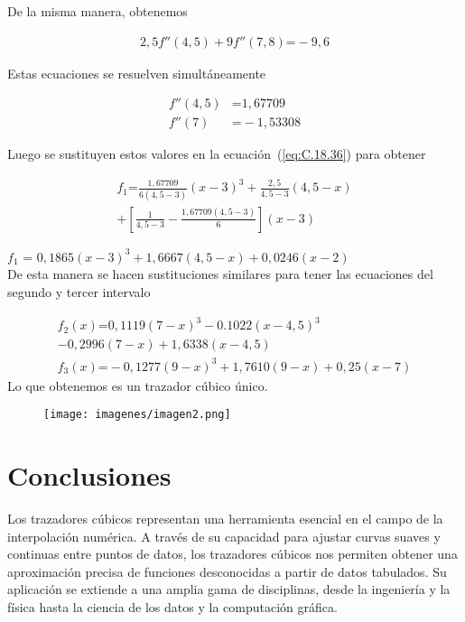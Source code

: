 \documentclass[conference]{IEEEtran}
\begin{document}
De la misma manera, obtenemos

\begin{align*}
	2,5f''(4,5) + 9f''(7,8) \text{=} -9,6
\end{align*}

Estas ecuaciones se resuelven simultáneamente

\begin{align*}
	f''(4,5) & \text{=} 1,67709  \\
	f''(7)   & \text{=} -1,53308
\end{align*}

Luego se sustituyen estos valores en la ecuación~(\ref{eq:C.18.36})
para obtener

\begin{multline*}
	f_{1} \text{=} \frac{1,67709}{6(4,5 - 3)}{(x - 3)}^{3}
	+ \frac{2,5}{4,5 - 3}(4,5 - x) \\
	+ [\frac{1}{4,5 - 3} - \frac{1,67709 (4,5 - 3)}{6}](x - 3)
\end{multline*}


	$f_{1}$ = $0,1865 {(x - 3)}^{3} + 1,6667 (4,5 - x) + 0,0246 (x - 2)$ \\


De esta manera se hacen sustituciones similares para tener las
ecuaciones del segundo y tercer intervalo

\begin{multline*}
	f_{2}(x) \text{=} 0,1119 {(7 - x)}^{3} - 0.1022 {(x - 4,5)}^{3} \\
	- 0,2996 (7 - x) + 1,6338 (x - 4,5) \\
	f_{3}(x) \text{=} -0,1277{(9 - x)}^{3} + 1,7610 (9 - x) + 0,25(x - 7)
\end{multline*}
Lo que obtenemos es un trazador cúbico único.
\begin{figure} [h]
            \centering
            \texttt{[image: imagenes/imagen2.png]}
            \caption{}
            \label{fig:fig1 }
       \end{figure}


\section{Conclusiones}

Los trazadores cúbicos representan una herramienta esencial en el campo de la interpolación numérica. A través de su capacidad para ajustar curvas suaves y continuas entre puntos de datos, los trazadores cúbicos nos permiten obtener una aproximación precisa de funciones desconocidas a partir de datos tabulados. Su aplicación se extiende a una amplia gama de disciplinas, desde la ingeniería y la física hasta la ciencia de los datos y la computación gráfica.
\end{document}
